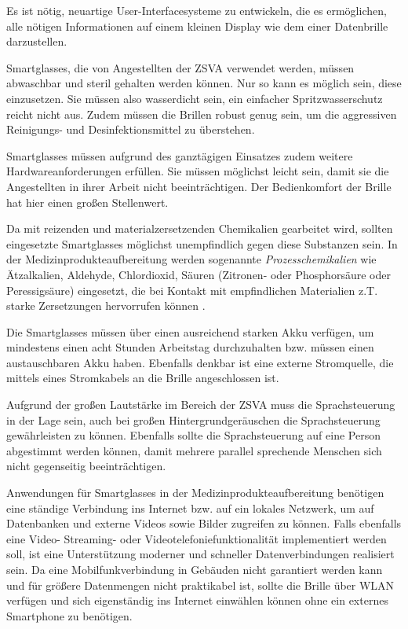 Es ist nötig, neuartige User-Interfacesysteme zu entwickeln, die es ermöglichen, alle nötigen Informationen auf einem kleinen Display wie dem einer Datenbrille darzustellen. 

Smartglasses, die von Angestellten der ZSVA verwendet werden, müssen abwaschbar und steril gehalten werden können. Nur so kann es möglich sein, diese einzusetzen. Sie müssen also wasserdicht sein, ein einfacher Spritzwasserschutz reicht nicht aus. Zudem müssen die Brillen robust genug sein, um die aggressiven Reinigungs- und Desinfektionsmittel zu überstehen.

Smartglasses müssen aufgrund des ganztägigen Einsatzes zudem weitere Hardwareanforderungen erfüllen. Sie müssen möglichst leicht sein, damit sie die Angestellten in ihrer Arbeit nicht beeinträchtigen. Der Bedienkomfort der Brille hat hier einen großen Stellenwert. 

Da mit reizenden und materialzersetzenden Chemikalien gearbeitet wird, sollten eingesetzte Smartglasses möglichst unempfindlich gegen diese Substanzen sein. In der Medizinprodukteaufbereitung werden sogenannte \emph{Prozesschemikalien} wie Ätzalkalien, Aldehyde, Chlordioxid, Säuren (Zitronen- oder Phosphorsäure oder Peressigsäure) eingesetzt, die bei Kontakt mit empfindlichen Materialien z.T. starke Zersetzungen hervorrufen können \cite{AKI-ArbeitskreisInstrumenten-Aufbereitung2012}.

Die Smartglasses müssen über einen ausreichend starken Akku verfügen, um mindestens einen acht Stunden Arbeitstag durchzuhalten bzw. müssen einen austauschbaren Akku haben. Ebenfalls denkbar ist eine externe Stromquelle, die mittels eines Stromkabels an die Brille angeschlossen ist.

Aufgrund der großen Lautstärke im Bereich der ZSVA muss die Sprachsteuerung in der Lage sein, auch bei großen Hintergrundgeräuschen die Sprachsteuerung gewährleisten zu können. Ebenfalls sollte die Sprachsteuerung auf eine Person abgestimmt werden können, damit mehrere parallel sprechende Menschen sich nicht gegenseitig beeinträchtigen.

Anwendungen für Smartglasses in der Medizinprodukteaufbereitung benötigen eine ständige Verbindung ins Internet bzw. auf ein lokales Netzwerk, um auf Datenbanken und externe Videos sowie Bilder zugreifen zu können. Falls ebenfalls eine Video- Streaming- oder Videotelefoniefunktionalität implementiert werden soll, ist eine Unterstützung moderner und schneller Datenverbindungen realisiert sein. Da eine Mobilfunkverbindung in Gebäuden nicht garantiert werden kann und für größere Datenmengen nicht praktikabel ist, sollte die Brille über WLAN verfügen und sich eigenständig ins Internet einwählen können ohne ein externes Smartphone zu benötigen.

